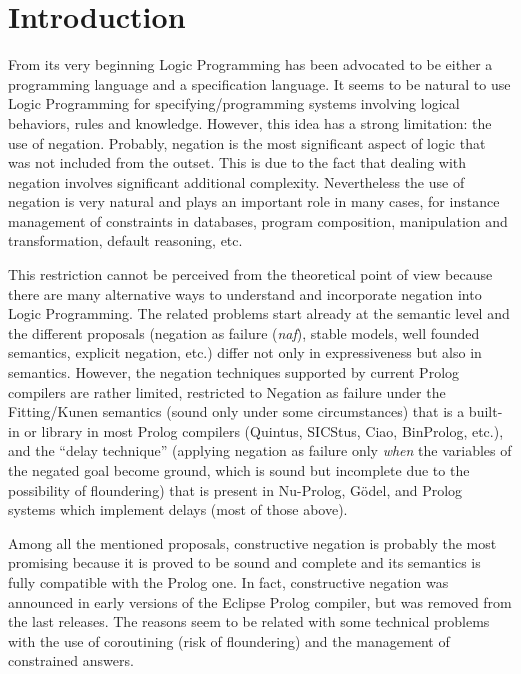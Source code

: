 \documentclass{llncs}
\newcommand{\naf}{{\em naf}}\newcommand{\viejo}[1]{}
\begin{document}

\section{Introduction}
\label{introduction}
From its very beginning Logic Programming has been advocated to be
either a programming language and a specification language.  It seems
to be natural to use Logic Programming for specifying/programming
systems involving logical behaviors, rules and knowledge. However,
this idea has a strong limitation: the use of negation.  Probably,
negation is the most significant aspect of logic that was not included
from the outset. This is due to the fact that dealing with negation
involves significant additional complexity.  Nevertheless the use of
negation is very natural and plays an important role in many cases,
for instance management of constraints in databases, program
composition, manipulation and transformation, default reasoning, etc.

This restriction cannot be perceived from the theoretical point of
view because there are many alternative ways to understand and
incorporate negation into Logic Programming. The related problems
start already at the semantic level and the different proposals
(negation as failure (\naf), stable models, well founded semantics,
explicit negation, etc.)  differ not only in expressiveness but also
in semantics.  However, the negation techniques supported by current
Prolog compilers are rather limited, restricted to Negation as failure
under the Fitting/Kunen semantics \cite{Kunen} (sound only under some
circumstances) that is a built-in or library in most Prolog compilers
(Quintus, SICStus, Ciao, BinProlog, etc.), and the ``delay technique''
(applying negation as failure only \emph{when} the variables of the
negated goal become ground, which is sound but incomplete due to the
possibility of floundering) that is present in Nu-Prolog, G\"odel, and
Prolog systems which implement delays (most of those above).

Among all the mentioned proposals, constructive negation is probably the most 
promising because it is proved to be sound and complete and
its semantics is fully compatible with the Prolog one. In fact, 
constructive negation was announced in early versions of the 
Eclipse Prolog compiler, but was removed from the last releases.
The reasons seem to be related with some technical problems with the use
of coroutining (risk of floundering) and the management of constrained answers.
\end{document}
